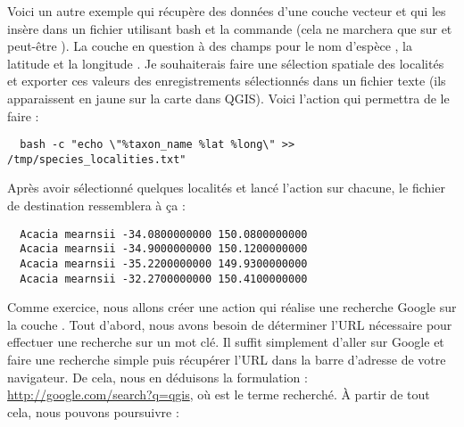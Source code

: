 Voici un autre exemple qui récupère des données d'une couche vecteur et qui les insère dans un fichier utilisant bash et la commande  (cela ne marchera que sur \nix et peut-être \osx). La couche en question à des champs pour le nom d'espèce , la latitude  et la longitude . Je souhaiterais faire une sélection spatiale des localités et exporter ces valeurs des enregistrements sélectionnés dans un fichier texte (ils apparaissent en jaune sur la carte dans QGIS). Voici l'action qui permettra de le faire :

\begin{verbatim}
  bash -c "echo \"%taxon_name %lat %long\" >> /tmp/species_localities.txt"
\end{verbatim}

Après avoir sélectionné quelques localités et lancé l'action sur chacune, le fichier de destination ressemblera à ça :

\begin{verbatim}
  Acacia mearnsii -34.0800000000 150.0800000000
  Acacia mearnsii -34.9000000000 150.1200000000
  Acacia mearnsii -35.2200000000 149.9300000000
  Acacia mearnsii -32.2700000000 150.4100000000
\end{verbatim}

Comme exercice, nous allons créer une action qui réalise une recherche Google sur la couche . Tout d'abord, nous avons besoin de déterminer l'URL nécessaire pour effectuer une recherche sur un mot clé. Il suffit simplement d'aller sur Google et faire une recherche simple puis récupérer l'URL dans la barre d'adresse de votre navigateur. De cela, nous en déduisons la formulation : \url{http://google.com/search?q=qgis}, où  est le terme recherché. À partir de tout cela, nous pouvons poursuivre :

